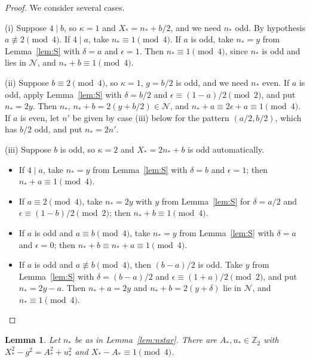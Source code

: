\documentclass[11pt]{amsart}
\newtheorem{lemma}[theorem]{Lemma}
\theoremstyle{remark}
\theoremstyle{definition}
\numberwithin{equation}{section}
\newcommand{\Nc}{\mathcal{N}}
\newcommand{\Zt}{\mathbb{Z}_2}
\begin{document}
\begin{proof}
We consider several cases.

(i) Suppose $4\mid b$, so $\kappa=1$ and $X_*=n_*+b/2$, and we need $n_*$ odd. By hypothesis $a\not\equiv 2\pmod 4$. If $4\mid a$, take $n_*\equiv1\pmod 4$. If $a$ is odd, take $n_*=y$ from Lemma~\ref{lem:S} with $\delta=a$ and $\epsilon=1$. Then $n_*\equiv1\pmod 4$, since $n_*$ is odd and lies in $\Nc$, and $n_*+b\equiv1\pmod 4$.

(ii) Suppose $b\equiv2\pmod 4$, so $\kappa=1$, $g=b/2$ is odd, and we need $n_*$ even. If $a$ is odd, apply Lemma~\ref{lem:S} with $\delta=b/2$ and $\epsilon\equiv(1-a)/2\pmod 2$, and put $n_*=2y$. Then $n_*,\,n_*+b=2(y+b/2)\in\Nc$, and $n_*+a\equiv2\epsilon+a\equiv1\pmod 4$. If $a$ is even, let $n'$ be given by case (iii) below for the pattern $(a/2,b/2)$, which has $b/2$ odd, and put $n_*=2n'$.

(iii) Suppose $b$ is odd, so $\kappa=2$ and $X_*=2n_*+b$ is odd automatically.
\begin{itemize}
\item If $4\mid a$, take $n_*=y$ from Lemma~\ref{lem:S} with $\delta=b$ and $\epsilon=1$; then $n_*+a\equiv1\pmod 4$.
\item If $a\equiv2\pmod 4$, take $n_*=2y$ with $y$ from Lemma~\ref{lem:S} for $\delta=a/2$ and $\epsilon\equiv(1-b)/2\pmod 2$; then $n_*+b\equiv1\pmod4$.
\item If $a$ is odd and $a\equiv b\pmod 4$, take $n_*=y$ from Lemma~\ref{lem:S} with $\delta=a$ and $\epsilon=0$; then $n_*+b\equiv n_*+a\equiv1\pmod4$.
\item If $a$ is odd and $a\not\equiv b\pmod4$, then $(b-a)/2$ is odd. Take $y$ from Lemma~\ref{lem:S} with $\delta=(b-a)/2$ and $\epsilon\equiv(1+a)/2\pmod 2$, and put $n_*=2y-a$. Then $n_*+a=2y$ and $n_*+b=2(y+\delta)$ lie in $\Nc$, and $n_*\equiv1\pmod 4$.\qedhere
\end{itemize}
\end{proof}

\begin{lemma}\label{lem:rep}
Let $n_*$ be as in Lemma~\ref{lem:nstar}. There are $A_*,u_*\in\Zt$ with $X_*^2-g^2=A_*^2+u_*^2$ and $X_*-A_*\equiv1\pmod 4$.
\end{lemma}
\end{document}
